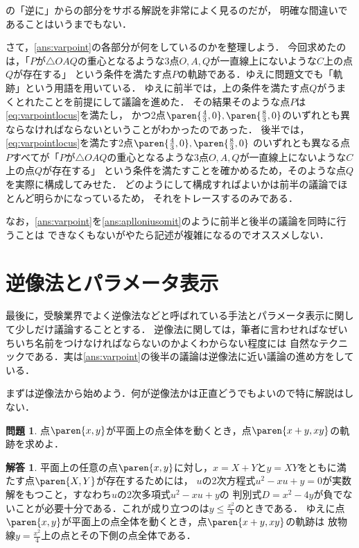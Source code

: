 \documentclass[11pt,a4paper]{ltjsarticle}
\newcommand*{\coord}[1]{\paren{#1}}
\theoremstyle{definition}
\newtheorem{que}[dfn]{問題}
\newtheorem{ans}[dfn]{解答}
\begin{document}
の「逆に」からの部分をサボる解説を非常によく見るのだが，
明確な間違いであることはいうまでもない．

さて，\cref{ans:varpoint}の各部分が何をしているのかを整理しよう．
今回求めたのは，「$P$が$\triangle OAQ$の重心となるような3点$O,A,Q$が一直線上にないような$C$上の点$Q$が存在する」
という条件を満たす点$P$の軌跡である．ゆえに問題文でも「軌跡」という用語を用いている．
ゆえに前半では，上の条件を満たす点$Q$がうまくとれたことを前提にして議論を進めた．
その結果そのような点$P$は\cref{eq:varpointlocus}を満たし，
かつ2点$\coord{\frac{4}{3}, 0}, \coord{\frac{8}{3}, 0}$のいずれとも異ならなければならないということがわかったのであった．
後半では，\cref{eq:varpointlocus}を満たす2点$\coord{\frac{4}{3}, 0}, \coord{\frac{8}{3}, 0}$
のいずれとも異なる点$P$すべてが「$P$が$\triangle OAQ$の重心となるような3点$O,A,Q$が一直線上にないような$C$上の点$Q$が存在する」
という条件を満たすことを確かめるため，そのような点$Q$を実際に構成してみせた．
どのようにして構成すればよいかは前半の議論でほとんど明らかになっているため，
それをトレースするのみである．

なお，\cref{ans:varpoint}を\cref{ans:aplloniusomit}のように前半と後半の議論を同時に行うことは
できなくもないがやたら記述が複雑になるのでオススメしない．



\section{逆像法とパラメータ表示}

最後に，受験業界でよく逆像法などと呼ばれている手法とパラメータ表示に関して少しだけ議論することとする．
逆像法に関しては，筆者に言わせればなぜいちいち名前をつけなければならないのかよくわからない程度には
自然なテクニックである．実は\cref{ans:varpoint}の後半の議論は逆像法に近い議論の進め方をしている．

まずは逆像法から始めよう．何が逆像法かは正直どうでもよいので特に解説はしない．

\begin{que} \label{que:invimage}
  点$\coord{x,y}$が平面上の点全体を動くとき，点$\coord{x+y, xy}$の軌跡を求めよ．
\end{que}

\begin{ans} \label{ans:invimage}
  平面上の任意の点$\coord{x,y}$に対し，$x = X + Y$と$y = XY$をともに満たす点$\coord{X,Y}$が存在するためには，
  $u$の2次方程式$u^2 - xu + y = 0$が実数解をもつこと，すなわち$u$の2次多項式$u^2 - xu + y$の
  判別式$D = x^2 - 4y$が負でないことが必要十分である．これが成り立つのは$y \leq \frac{x^2}{4}$のときである．
  ゆえに点$\coord{x, y}$が平面上の点全体を動くとき，点$\coord{x+y, xy}$の軌跡は
  放物線$y = \frac{x^2}{4}$上の点とその下側の点全体である．
\end{ans}
\end{document}
